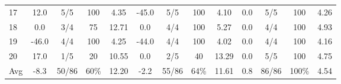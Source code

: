 \begin{table}[p]
{\begin{tabular}{l|cccc|cccc|cccc}
17 & 12.0 & 5/5 & 100 & 4.35 & -45.0 & 5/5 & 100 & 4.10 & 0.0 & 5/5 & 100 & 4.26 \\
18 & 0.0 & 3/4 & 75 & 12.71 & 0.0 & 4/4 & 100 & 5.27 & 0.0 & 4/4 & 100 & 4.93 \\
19 & -46.0 & 4/4 & 100 & 4.25 & -44.0 & 4/4 & 100 & 4.02 & 0.0 & 4/4 & 100 & 4.16 \\
20 & 17.0 & 1/5 & 20 & 10.55 & 0.0 & 2/5 & 40 & 13.29 & 0.0 & 5/5 & 100 & 4.75 \\
\midrule
Avg & -8.3 & 50/86 & 60\% & 12.20 & -2.2 & 55/86 & 64\% & 11.61 & 0.8 & 86/86 & 100\% & 4.54 \\
\bottomrule
\end{tabular}%
}
\end{table}
